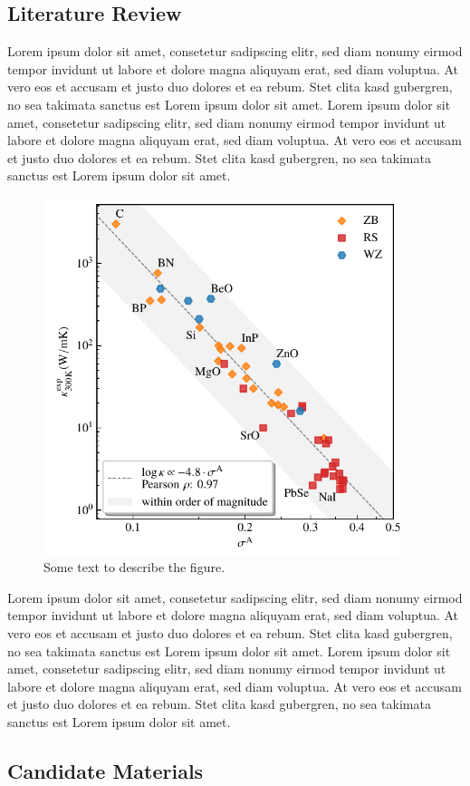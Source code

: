 \subsection{Literature Review}
Lorem ipsum dolor sit amet, consetetur sadipscing elitr, sed diam nonumy eirmod tempor invidunt ut labore et dolore magna aliquyam erat, sed diam voluptua. At vero eos et accusam et justo duo dolores et ea rebum. Stet clita kasd gubergren, no sea takimata sanctus est Lorem ipsum dolor sit amet. Lorem ipsum dolor sit amet, consetetur sadipscing elitr, sed diam nonumy eirmod tempor invidunt ut labore et dolore magna aliquyam erat, sed diam voluptua. At vero eos et accusam et justo duo dolores et ea rebum. Stet clita kasd gubergren, no sea takimata sanctus est Lorem ipsum dolor sit amet.

\begin{figure}
	\includegraphics[width=4.1in]{./plots/anharmonicity/9_kappa/sigma_vs_kappa.pdf}
	\caption{
		Some text to describe the figure.
	}
\end{figure}

Lorem ipsum dolor sit amet, consetetur sadipscing elitr, sed diam nonumy eirmod tempor invidunt ut labore et dolore magna aliquyam erat, sed diam voluptua. At vero eos et accusam et justo duo dolores et ea rebum. Stet clita kasd gubergren, no sea takimata sanctus est Lorem ipsum dolor sit amet. Lorem ipsum dolor sit amet, consetetur sadipscing elitr, sed diam nonumy eirmod tempor invidunt ut labore et dolore magna aliquyam erat, sed diam voluptua. At vero eos et accusam et justo duo dolores et ea rebum. Stet clita kasd gubergren, no sea takimata sanctus est Lorem ipsum dolor sit amet.

\subsection{Candidate Materials}